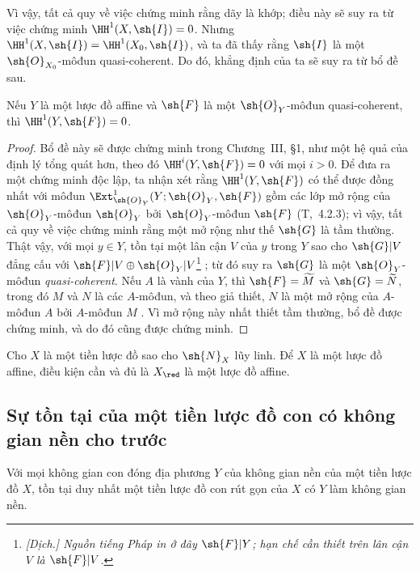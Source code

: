 \documentclass[oneside]{amsart}
\newcommand{\oldpage}[2][]{{\marginnote{\normalfont\textbf{#1}~|~#2}}\ignorespaces}
\let\EGAOriginalLabel\label
\renewcommand{\label}[1]{\phantomsection\EGAOriginalLabel{#1}}
\begin{document}
Vì vậy, tất cả quy về việc chứng minh rằng dãy  là khớp; điều này sẽ suy ra từ việc chứng minh $\HH^1(X,\sh{I})=0$.
\oldpage[I]{131}
Nhưng $\HH^1(X,\sh{I})=\HH^1(X_0,\sh{I})$, và ta đã thấy rằng $\sh{I}$ là một $\sh{O}_{X_0}$-môđun quasi-coherent.
Do đó, khẳng định của ta sẽ suy ra từ bổ đề sau.
\begin{lemma}[5.1.9.2]
\label{I.5.1.9.2}
Nếu $Y$ là một lược đồ affine và $\sh{F}$ là một $\sh{O}_Y$-môđun quasi-coherent, thì $\HH^1(Y,\sh{F})=0$.
\end{lemma}

\begin{proof}
Bổ đề này sẽ được chứng minh trong Chương~III, §1, như một hệ quả của định lý tổng quát hơn, theo đó $\HH^i(Y,\sh{F})=0$ với mọi $i>0$.
Để đưa ra một chứng minh độc lập, ta nhận xét rằng $\HH^1(Y,\sh{F})$ có thể được đồng nhất với môđun $\Ext_{\sh{O}_Y}^1(Y;\sh{O}_Y,\sh{F})$ gồm các lớp mở rộng của $\sh{O}_Y$-môđun $\sh{O}_Y$ bởi $\sh{O}_Y$-môđun $\sh{F}$ (T,~4.2.3);
vì vậy, tất cả quy về việc chứng minh rằng một mở rộng như thế $\sh{G}$ là tầm thường.
Thật vậy, với mọi $y\in Y$, tồn tại một lân cận $V$ của $y$ trong $Y$ sao cho $\sh{G}|V$ đẳng cấu với $\sh{F}|V\oplus\sh{O}_Y|V$\footnote{\emph{[Dịch.] Nguồn tiếng Pháp in ở đây $\sh{F}|Y$; hạn chế cần thiết trên lân cận $V$ là $\sh{F}|V$.}} ;
từ đó suy ra $\sh{G}$ là một $\sh{O}_Y$-môđun \emph{quasi-coherent}.
Nếu $A$ là vành của $Y$, thì $\sh{F}=\widetilde{M}$ và $\sh{G}=\widetilde{N}$, trong đó $M$ và $N$ là các $A$-môđun, và theo giả thiết, $N$ là một mở rộng của $A$-môđun $A$ bởi $A$-môđun $M$ .
Vì mở rộng này nhất thiết tầm thường, bổ đề được chứng minh, và do đó  cũng được chứng minh.
\end{proof}

\begin{corollary}[5.1.10]
\label{I.5.1.10}
Cho $X$ là một tiền lược đồ sao cho $\sh{N}_X$ lũy linh.
Để $X$ là một lược đồ affine, điều kiện cần và đủ là $X_\red$ là một lược đồ affine.
\end{corollary}

\subsection{Sự tồn tại của một tiền lược đồ con có không gian nền cho trước}
\label{subsection:I.5.2}

\begin{proposition}[5.2.1]
\label{I.5.2.1}
Với mọi không gian con đóng địa phương $Y$ của không gian nền của một tiền lược đồ $X$, tồn tại duy nhất một tiền lược đồ con rút gọn của $X$ có $Y$ làm không gian nền.
\end{proposition}
\end{document}
